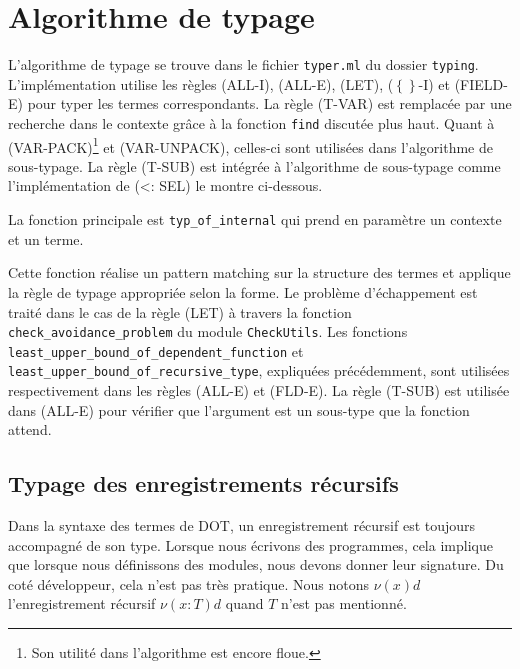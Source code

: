 \section{Algorithme de typage}

L'algorithme de typage se trouve dans le fichier \verb|typer.ml| du dossier \verb|typing|.
L'implémentation utilise les règles (ALL-I), (ALL-E), (LET), ($\left\{
\right\}$-I) et (FIELD-E) pour typer les termes correspondants. La règle (T-VAR)
est remplacée par une recherche dans le contexte grâce à la fonction \verb|find|
discutée plus haut.
Quant à (VAR-PACK)\footnote{Son utilité dans l'algorithme est encore floue.} et
(VAR-UNPACK), celles-ci sont utilisées dans l'algorithme de sous-typage.
La règle (T-SUB) est intégrée à l'algorithme de sous-typage comme
l'implémentation de (<: SEL) le montre ci-dessous.

La fonction principale est \verb|typ_of_internal| qui prend en paramètre un
contexte et un terme. 

Cette fonction réalise un pattern matching sur la structure des
termes et applique la règle de typage appropriée selon la forme. Le problème
d'échappement est traité dans le cas de la règle (LET) à travers la
fonction \\ \verb|check_avoidance_problem| du module \verb|CheckUtils|. Les
fonctions \\ \verb|least_upper_bound_of_dependent_function| et \\
\verb|least_upper_bound_of_recursive_type|, expliquées précédemment, sont
utilisées respectivement dans les règles (ALL-E) et (FLD-E). La règle (T-SUB) est
utilisée dans (ALL-E) pour vérifier que l'argument est un sous-type que la
fonction attend.

\subsection*{Typage des enregistrements récursifs}

Dans la syntaxe des termes de DOT, un enregistrement récursif est toujours accompagné de
son type. Lorsque nous écrivons des programmes, cela implique que lorsque nous
définissons des modules, nous devons donner leur signature. Du
coté développeur, cela n'est pas très pratique. Nous notons $\nu(x) d$
l'enregistrement récursif $\nu(x : T) d$ quand $T$ n'est pas mentionné.

